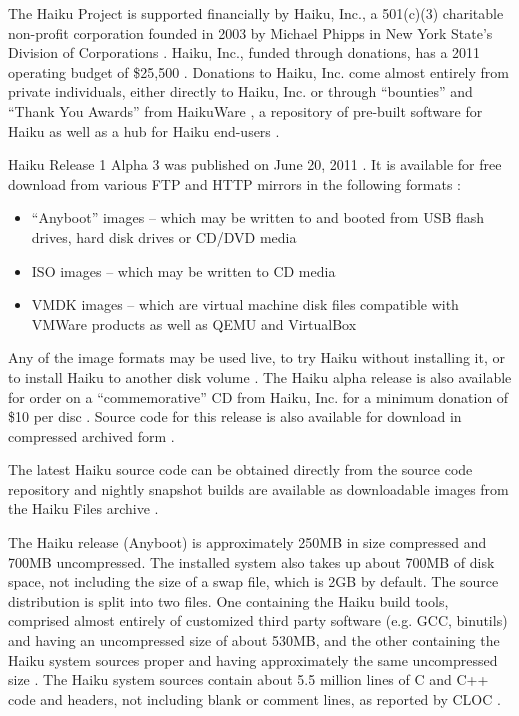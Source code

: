 \documentclass{article}
\begin{document}
The Haiku Project is supported financially by Haiku, Inc., a 501(c)(3)
charitable non-profit corporation founded in 2003 by Michael Phipps in
New York State's Division of Corporations \cite{HaikuIncAbout,
HaikuInc}.  Haiku, Inc., funded through donations, has a 2011
operating budget of \$25,500 \cite{HaikuIncDocs}.  Donations to Haiku,
Inc. come almost entirely from private individuals, either directly to
Haiku, Inc. or through ``bounties'' and ``Thank You Awards'' from
HaikuWare \cite{HaikuIncDonors, HaikuWareBounties}, a repository of
pre-built software for Haiku as well as a hub for Haiku end-users
\cite{HaikuWareAbout}.

Haiku Release 1 Alpha 3 was published on June 20, 2011
\cite{HaikuRelease}.  It is available for free download from various
FTP and HTTP mirrors in the following formats \cite{HaikuGet}:
\begin{itemize}
\item ``Anyboot'' images -- which may be written to and booted from
  USB flash drives, hard disk drives or CD/DVD media
\item ISO images -- which may be written to CD media
\item VMDK images -- which are virtual machine disk files compatible
  with VMWare products as well as QEMU and VirtualBox \cite{VMDKWiki}
\end{itemize}
Any of the image formats may be used live, to try Haiku without
installing it, or to install Haiku to another disk volume
\cite{HaikuGet}.  The Haiku alpha release is also available for order
on a ``commemorative'' CD from Haiku, Inc. for a minimum donation of
\$10 per disc \cite{HaikuIncOrder}.  Source code for this release is
also available for download in compressed archived form
\cite{HaikuR1A3Src}.

The latest Haiku source code can be obtained directly from the source
code repository \cite{HaikuGetSvn} and nightly snapshot builds are
available as downloadable images from the Haiku Files archive
\cite{HaikuFiles}.

The Haiku release (Anyboot) is approximately 250MB in size compressed
\cite{HaikuGet} and 700MB uncompressed.  The installed system also
takes up about 700MB of disk space, not including the size of a swap
file, which is 2GB by default.  The source distribution is split into
two files.  One containing the Haiku build tools, comprised almost
entirely of customized third party software (e.g. GCC, binutils) and
having an uncompressed size of about 530MB, and the other containing
the Haiku system sources proper and having approximately the same
uncompressed size \cite{HaikuR1A3Src}.  The Haiku system sources
contain about 5.5 million lines of C and C++ code and headers, not
including blank or comment lines, as reported by CLOC \cite{Cloc}.
\end{document}
